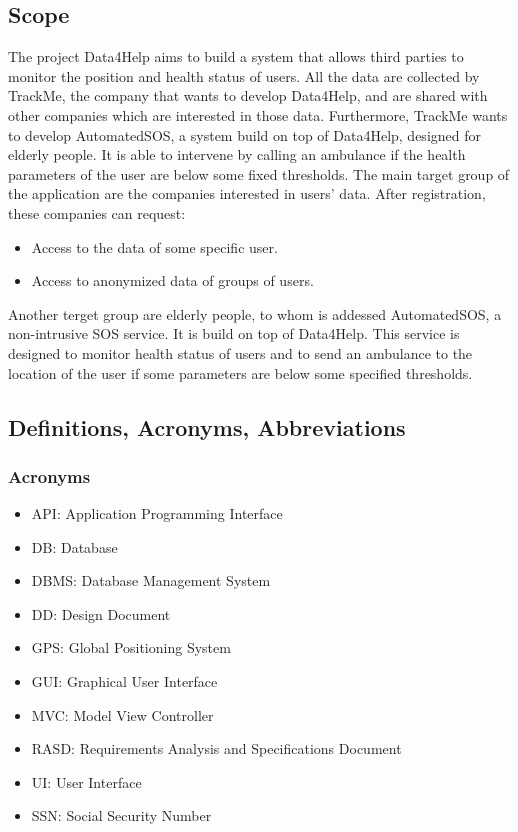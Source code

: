 \documentclass{article}
\begin{document}
\subsection{Scope}
The project Data4Help aims to build a system that allows third parties to monitor the position and health status of users. All the data are collected by TrackMe, the company that wants to develop Data4Help, and are shared with other companies which are interested in those data. Furthermore, TrackMe wants to develop AutomatedSOS, a system build on top of Data4Help, designed for elderly people. It is able to intervene by calling an ambulance if the health parameters of the user are below some fixed thresholds.
The main target group of the application are the companies interested in users' data.
After registration, these companies can request:
\begin{itemize}
\item Access to the data of some specific user.
\item Access to anonymized data of groups of users.
\end{itemize}
Another terget group are elderly people, to whom is addessed AutomatedSOS, a non-intrusive SOS service. It is build on top of Data4Help. This service is designed to monitor health status of users and to send an ambulance to the location of the user if some parameters are below some specified thresholds.
\subsection{Definitions, Acronyms, Abbreviations}
\subsubsection{Acronyms}
\begin{itemize}
\item API: Application Programming Interface
\item DB: Database
\item DBMS: Database Management System 
\item DD: Design Document
\item GPS: Global Positioning System
\item GUI: Graphical User Interface
\item MVC: Model View Controller
\item RASD: Requirements Analysis and Specifications Document
\item UI: User Interface
\item SSN: Social Security Number
\end{itemize}
\end{document}
